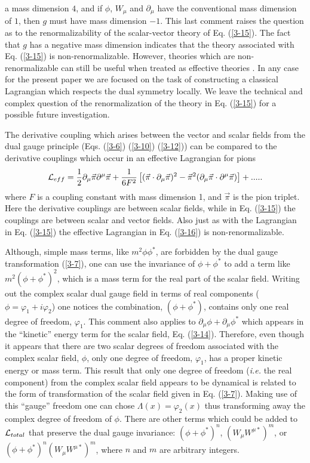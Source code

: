 \documentclass[a4paper,aps]{revtex4}
\begin{document}
a mass dimension $4$, and if $\phi$, $W_{\mu}$ and $\partial_{\mu}$
have the conventional mass dimension of $1$, then $g$ must have
mass dimension $-1$. This last comment raises the question
as to the renormalizability of the scalar-vector theory of
Eq. (\ref{3-15}). The fact that $g$ has a negative mass dimension
indicates that the theory associated with Eq. (\ref{3-15}) is
non-renormalizable. However, theories which are non-renormalizable
can still be useful when treated as effective theories
\cite{wein}. In any case for the present paper we are focused
on the task of constructing a classical Lagrangian which
respects the dual symmetry locally. We leave the technical
and complex question of the renormalization of the theory
in Eq. (\ref{3-15}) for a possible future investigation.

The derivative coupling which arises between the vector and scalar
fields from the dual gauge principle (Eqs. (\ref{3-6})
(\ref{3-10}) (\ref{3-12})) can be compared to the derivative
couplings which occur in an effective Lagrangian for pions \cite{don}
\begin{equation}
\label{3-16}
{\cal L}_{eff} = \frac{1}{2} \partial _{\mu} {\vec \pi}
\partial^{\mu} {\vec \pi} + \frac{1}{6F^2}\left[ ({\vec \pi}\cdot
\partial _{\mu} {\vec \pi})^2 - {\vec \pi}^2 (\partial _{\mu}
{\vec \pi} \cdot \partial ^{\mu} {\vec \pi}) \right] +.....
\end{equation}
where $F$ is a coupling constant with mass dimension 1, and
${\vec \pi}$ is the pion triplet. Here the derivative couplings are
between scalar fields, while in Eq. (\ref{3-15}) the couplings are between
scalar and vector fields. Also just as with the Lagrangian
in Eq. (\ref{3-15}) the effective Lagrangian in Eq. (\ref{3-16}) is
non-renormalizable.

Although, simple mass terms, like $m^2 \phi \phi ^{\ast}$, are
forbidden by the dual gauge
transformation (\ref{3-7}), one can use the invariance
of $\phi + \phi ^{\ast}$ to add a term like
$m^2 (\phi + \phi ^{\ast})^2$, which is a mass term for
the real part of the scalar field. Writing out the complex scalar dual
gauge field in terms of real components ($\phi = \varphi _1 + i \varphi _2$)
one notices the  combination, $(\phi + \phi ^{\ast})$, contains
only one real degree of freedom, $\varphi _1$. This comment also
applies to $\partial _{\mu} \phi + \partial _{\mu}
\phi ^{\ast}$ which appears in the ``kinetic'' energy term
for the scalar field, Eq. (\ref{3-14}). Therefore, even though it
appears that there are two scalar degrees of freedom associated with
the complex scalar field, $\phi$, only one degree of freedom,
$\varphi _1$, has a proper kinetic energy or mass term. This
result that only one degree of freedom ({\it i.e.} the real
component) from the complex scalar field appears to be dynamical
is related to the form of transformation of the scalar field
given in Eq. (\ref{3-7}). Making use of this ``gauge'' freedom
one can chose $\Lambda (x) = \varphi _2 (x)$ thus transforming away
the complex degree of freedom of $\phi$.
There are other terms which could be added to ${\cal L}_{total}$ that
preserve the dual gauge invariance: $(\phi +
\phi ^{\ast}) ^n$, $(W_{\mu} W^{\mu \ast})^m$, or
$(\phi + \phi ^{\ast}) ^n (W_{\mu} W^{\mu \ast})^m$, where $n$ and $m$
are arbitrary integers.
\end{document}
